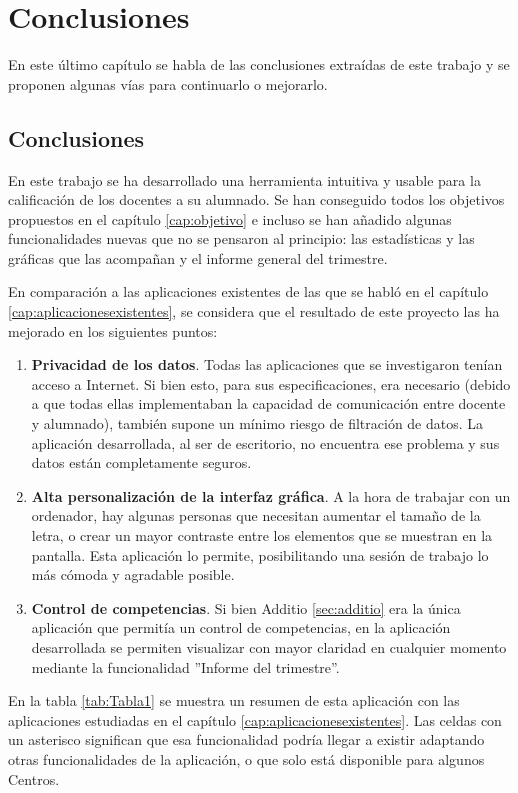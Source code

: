 \chapter{Conclusiones}
\label{cap:conclusiones}
En este último capítulo se habla de las conclusiones extraídas de este trabajo y se proponen algunas vías para continuarlo o mejorarlo.

\section{Conclusiones}
En este trabajo se ha desarrollado una herramienta intuitiva y usable para la calificación de los docentes a su alumnado. Se han conseguido todos los objetivos propuestos en el capítulo \ref{cap:objetivo} e incluso se han añadido algunas funcionalidades nuevas que no se pensaron al principio: las estadísticas y las gráficas que las acompañan y el informe general del trimestre.

En comparación a las aplicaciones existentes de las que se habló en el capítulo \ref{cap:aplicacionesexistentes}, se considera que el resultado de este proyecto las ha mejorado en los siguientes puntos:
\begin{enumerate}
	\item \textbf{Privacidad de los datos}. Todas las aplicaciones que se investigaron tenían acceso a Internet. Si bien esto, para sus especificaciones, era necesario (debido a que todas ellas implementaban la capacidad de comunicación entre docente y alumnado), también supone un mínimo riesgo de filtración de datos. La aplicación desarrollada, al ser de escritorio, no encuentra ese problema y sus datos están completamente seguros.
	\item \textbf{Alta personalización de la interfaz gráfica}. A la hora de trabajar con un ordenador, hay algunas personas que necesitan aumentar el tamaño de la letra, o crear un mayor contraste entre los elementos que se muestran en la pantalla. Esta aplicación lo permite, posibilitando una sesión de trabajo lo más cómoda y agradable posible.
	\item \textbf{Control de competencias}. Si bien Additio \ref{sec:additio} era la única aplicación que permitía un control de competencias, en la aplicación desarrollada se permiten visualizar con mayor claridad en cualquier momento mediante la funcionalidad ''Informe del trimestre''.
\end{enumerate}

En la tabla \ref{tab:Tabla1} se muestra un resumen de esta aplicación con las aplicaciones estudiadas en el capítulo \ref{cap:aplicacionesexistentes}. Las celdas con un asterisco significan que esa funcionalidad podría llegar a existir adaptando otras funcionalidades de la aplicación, o que solo está disponible para algunos Centros.

